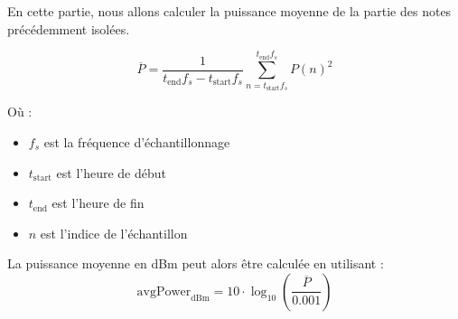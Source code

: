
En cette partie, nous allons calculer la puissance moyenne de la partie des notes précédemment isolées.

\begin{equation}
    \overline{P} = \frac{1}{t_{\text{end}} f_s - t_{\text{start}} f_s} \sum_{n=t_{\text{start}} f_s}^{t_{\text{end}} f_s} P(n)^2
\end{equation}


Où :
\begin{itemize}
  \item \( f_s \) est la fréquence d'échantillonnage
  \item \( t_{\text{start}} \) est l'heure de début
  \item \( t_{\text{end}} \) est l'heure de fin
  \item \( n \) est l'indice de l'échantillon
\end{itemize}

La puissance moyenne en dBm peut alors être calculée en utilisant :
\begin{equation}
    \text{avgPower}_{\text{dBm}} = 10 \cdot \log_{10}\left(\frac{\overline{P}}{0.001}\right)
\end{equation}

